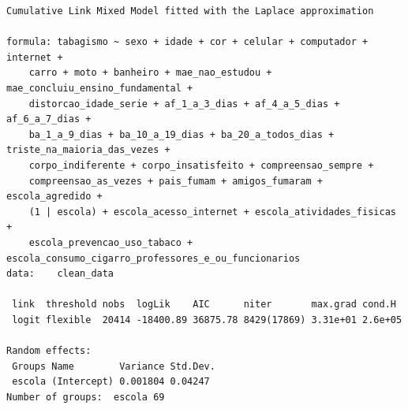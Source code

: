 \documentclass[
]{article}
\begin{document}
\begin{verbatim}
Cumulative Link Mixed Model fitted with the Laplace approximation

formula: tabagismo ~ sexo + idade + cor + celular + computador + internet +  
    carro + moto + banheiro + mae_nao_estudou + mae_concluiu_ensino_fundamental +  
    distorcao_idade_serie + af_1_a_3_dias + af_4_a_5_dias + af_6_a_7_dias +  
    ba_1_a_9_dias + ba_10_a_19_dias + ba_20_a_todos_dias + triste_na_maioria_das_vezes +  
    corpo_indiferente + corpo_insatisfeito + compreensao_sempre +  
    compreensao_as_vezes + pais_fumam + amigos_fumaram + escola_agredido +  
    (1 | escola) + escola_acesso_internet + escola_atividades_fisicas +  
    escola_prevencao_uso_tabaco + escola_consumo_cigarro_professores_e_ou_funcionarios
data:    clean_data

 link  threshold nobs  logLik    AIC      niter       max.grad cond.H 
 logit flexible  20414 -18400.89 36875.78 8429(17869) 3.31e+01 2.6e+05

Random effects:
 Groups Name        Variance Std.Dev.
 escola (Intercept) 0.001804 0.04247 
Number of groups:  escola 69 


\end{verbatim}
\end{document}
